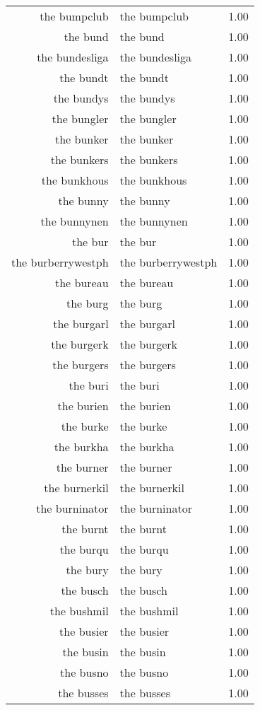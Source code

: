 \begin{table}[ht]
\begin{tabular}{rlr}
  the bumpclub & the bumpclub & 1.00 \\ 
  the bund & the bund & 1.00 \\ 
  the bundesliga & the bundesliga & 1.00 \\ 
  the bundt & the bundt & 1.00 \\ 
  the bundys & the bundys & 1.00 \\ 
  the bungler & the bungler & 1.00 \\ 
  the bunker & the bunker & 1.00 \\ 
  the bunkers & the bunkers & 1.00 \\ 
  the bunkhous & the bunkhous & 1.00 \\ 
  the bunny & the bunny & 1.00 \\ 
  the bunnynen & the bunnynen & 1.00 \\ 
  the bur & the bur & 1.00 \\ 
  the burberrywestph & the burberrywestph & 1.00 \\ 
  the bureau & the bureau & 1.00 \\ 
  the burg & the burg & 1.00 \\ 
  the burgarl & the burgarl & 1.00 \\ 
  the burgerk & the burgerk & 1.00 \\ 
  the burgers & the burgers & 1.00 \\ 
  the buri & the buri & 1.00 \\ 
  the burien & the burien & 1.00 \\ 
  the burke & the burke & 1.00 \\ 
  the burkha & the burkha & 1.00 \\ 
  the burner & the burner & 1.00 \\ 
  the burnerkil & the burnerkil & 1.00 \\ 
  the burninator & the burninator & 1.00 \\ 
  the burnt & the burnt & 1.00 \\ 
  the burqu & the burqu & 1.00 \\ 
  the bury & the bury & 1.00 \\ 
  the busch & the busch & 1.00 \\ 
  the bushmil & the bushmil & 1.00 \\ 
  the busier & the busier & 1.00 \\ 
  the busin & the busin & 1.00 \\ 
  the busno & the busno & 1.00 \\ 
  the busses & the busses & 1.00 \\ 

\end{tabular}
\end{table}
